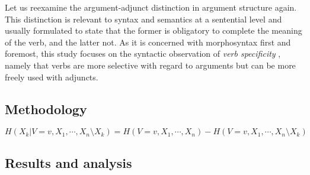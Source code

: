 Let us reexamine the argument-adjunct distinction in argument structure again. This distinction is relevant to syntax and semantics at a sentential level and usually formulated to state that the former is obligatory to complete the meaning of the verb, and the latter not. As it is concerned with morphosyntax first and foremost, this study focuses on the syntactic observation of \textit{verb specificity} \citep[cf.]{haspelmath2015a}, namely that verbs are more selective with regard to arguments but can be more freely used with adjuncts. 





\subsection{Methodology}

$$H(X_{k} | V = v, X_{1},\cdots,X_{n} \setminus X_{k}) = H( V = v, X_{1},\cdots,X_{n}) - H( V = v, X_{1},\cdots,X_{n}\setminus X_{k})$$

\subsection{Results and analysis}

